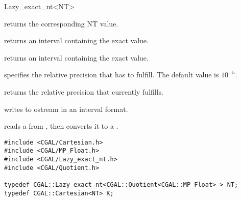 \begin{ccRefClass} {Lazy_exact_nt<NT>}
\ccOperations

 {returns the corresponding NT value.}

 {returns an interval containing the
exact value.}

 {returns an interval containing the 
exact value.}

{specifies the relative precision that  has to fulfill.
The default value is $10^{-5}$.  }

{returns the relative precision that  currently fulfills.}

{writes  to ostream  in an interval format.}

{reads a  from , then converts it to a .}

\ccExample

\begin{verbatim}
#include <CGAL/Cartesian.h>
#include <CGAL/MP_Float.h>
#include <CGAL/Lazy_exact_nt.h>
#include <CGAL/Quotient.h>

typedef CGAL::Lazy_exact_nt<CGAL::Quotient<CGAL::MP_Float> > NT;
typedef CGAL::Cartesian<NT> K;
\end{verbatim}

\end{ccRefClass} 

